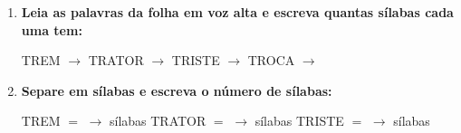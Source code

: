 \begin{exercicio}
\begin{enumerate}[resume]
  \item \textbf{Leia as palavras da folha em voz alta e escreva quantas sílabas cada uma tem:}

  \begin{center}
  TREM $\rightarrow$ \underline{\hspace{1cm}} \quad TRATOR $\rightarrow$ \underline{\hspace{1cm}} \quad TRISTE $\rightarrow$ \underline{\hspace{1cm}} \quad TROCA $\rightarrow$ \underline{\hspace{1cm}}
  \end{center}

  \item \textbf{Separe em sílabas e escreva o número de sílabas:}
  \begin{center}
  TREM $=$ \underline{\hspace{1.2cm}} $\rightarrow$ \underline{\hspace{0.8cm}} sílabas \quad TRATOR $=$ \underline{\hspace{1.2cm}} $\rightarrow$ \underline{\hspace{0.8cm}} sílabas \quad TRISTE $=$ \underline{\hspace{1.2cm}} $\rightarrow$ \underline{\hspace{0.8cm}} sílabas
  \end{center}

\end{enumerate}

\end{exercicio}



